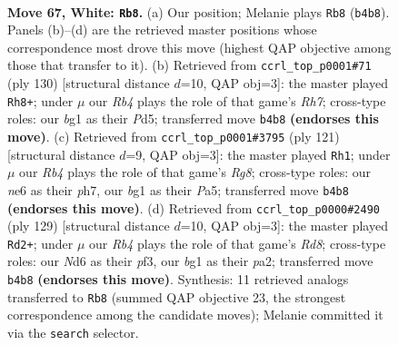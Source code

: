 \documentclass[11pt]{article}
\begin{document}
\clearpage

\begin{figure}[p]\centering
\begin{subfigure}{0.46\textwidth}\centering
\resizebox{\linewidth}{!}{%
\newchessgame
\chessboard[
  setfen={8/7k/3Nn3/P7/1R6/7r/2K5/6b1 w - - 1 67},
  showmover=false,
  pgfstyle=straightmove, color=movearrow, markmove={b4-b8}
]}
\caption{}
\end{subfigure}\hfill
\begin{subfigure}{0.46\textwidth}\centering
\resizebox{\linewidth}{!}{%
\newchessgame
\chessboard[
  setfen={2k5/7R/3p4/K2P4/2r5/8/8/8 w - - 3 66},
  showmover=false,
  pgfstyle=straightmove, color=movearrow, markmove={h7-h8}
]}
\caption{}
\end{subfigure}
\\[4pt]
\begin{subfigure}{0.46\textwidth}\centering
\resizebox{\linewidth}{!}{%
\newchessgame
\chessboard[
  setfen={2R2K2/7P/p7/p7/8/3k4/8/6r1 b - - 14 61},
  showmover=false,
  pgfstyle=straightmove, color=movearrow, markmove={g1-h1}
]}
\caption{}
\end{subfigure}\hfill
\begin{subfigure}{0.46\textwidth}\centering
\resizebox{\linewidth}{!}{%
\newchessgame
\chessboard[
  setfen={8/8/5k2/7R/p7/5P2/P6K/3r4 b - - 2 65},
  showmover=false,
  pgfstyle=straightmove, color=movearrow, markmove={d1-d2}
]}
\caption{}
\end{subfigure}
\caption{\textbf{Move 67, White: \texttt{Rb8}.} (a) Our position; Melanie plays \texttt{Rb8} (\texttt{b4b8}). Panels (b)--(d) are the retrieved master positions whose correspondence most drove this move (highest QAP objective among those that transfer to it). (b) Retrieved from \texttt{ccrl\_top\_p0001\#71} (ply 130) [structural distance $d$=10, QAP obj=3]: the master played \texttt{Rh8+}; under $\mu$ our \emph{Rb4} plays the role of that game's \emph{Rh7}; cross-type roles: our \emph{b}g1 as their \emph{P}d5; transferred move \texttt{b4b8} \textbf{(endorses this move)}. (c) Retrieved from \texttt{ccrl\_top\_p0001\#3795} (ply 121) [structural distance $d$=9, QAP obj=3]: the master played \texttt{Rh1}; under $\mu$ our \emph{Rb4} plays the role of that game's \emph{Rg8}; cross-type roles: our \emph{n}e6 as their \emph{p}h7, our \emph{b}g1 as their \emph{P}a5; transferred move \texttt{b4b8} \textbf{(endorses this move)}. (d) Retrieved from \texttt{ccrl\_top\_p0000\#2490} (ply 129) [structural distance $d$=10, QAP obj=3]: the master played \texttt{Rd2+}; under $\mu$ our \emph{Rb4} plays the role of that game's \emph{Rd8}; cross-type roles: our \emph{N}d6 as their \emph{p}f3, our \emph{b}g1 as their \emph{p}a2; transferred move \texttt{b4b8} \textbf{(endorses this move)}. Synthesis: 11 retrieved analogs transferred to \texttt{Rb8} (summed QAP objective 23, the strongest correspondence among the candidate moves); Melanie committed it via the \texttt{search} selector.}
\label{fig:thought-m132}
\end{figure}
\end{document}
